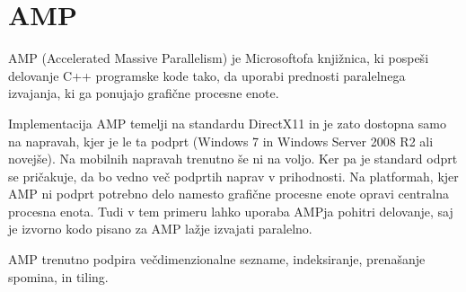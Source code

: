 \section{AMP}

AMP (Accelerated Massive Parallelism) je Microsoftofa knjižnica, ki pospeši delovanje C++ programske kode tako, da uporabi prednosti paralelnega izvajanja, ki ga ponujajo grafične procesne enote. 

Implementacija AMP temelji na standardu DirectX11 in je zato dostopna samo na napravah, kjer je le ta podprt (Windows 7 in Windows Server 2008 R2 ali novejše). Na mobilnih napravah trenutno še ni na voljo. Ker pa je standard odprt se pričakuje, da bo vedno več podprtih naprav v prihodnosti. Na platformah, kjer AMP ni podprt potrebno delo namesto grafične procesne enote opravi centralna procesna enota. Tudi v tem primeru lahko uporaba AMPja pohitri delovanje, saj je izvorno kodo pisano za AMP lažje izvajati paralelno.

AMP trenutno podpira večdimenzionalne sezname, indeksiranje, prenašanje spomina, in tiling.
